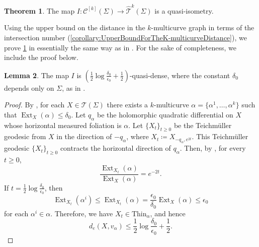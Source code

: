 \documentclass[a4paper,11pt]{amsart}
\numberwithin{equation}{section}
\theoremstyle{definition}
\newtheorem{theorem}{Theorem}[section]
\newtheorem{lemma}[theorem]{Lemma}
\newcommand{\Teich}{\mathcal{T}}
\newcommand{\elTeich}{\hat{\mathcal{T}}}
\DeclareMathOperator{\Ext}{Ext}
\newcommand{\Thin}{\mathrm{Thin}}
\newcommand{\multicurve}[1]{\mathcal{C}^{[#1]}}
\begin{document}
\begin{theorem}\label{theorem:K-ElectricTeichmullerSpaceAndK-multicurveGraphAreQI}
    The map $I \colon \multicurve{k}(\Sigma) \to \elTeich^k(\Sigma)$ is a   quasi-isometry.
\end{theorem}

Using the upper bound on the distance in the $k$-multicurve graph in terms of the intersection number (\cref{corollary:UpperBoundForTheK-multicurveDistance}), we prove \cref{theorem:K-ElectricTeichmullerSpaceAndK-multicurveGraphAreQI} in essentially the same way as in \cite{masur1999complex}.
For the sake of completeness, we include the proof below.

\begin{lemma}\label{lemma:QuasiDensityOfI}
    The map $I$ is $(\frac12 \log \frac{\delta_0}{\epsilon_0} + \frac12)$-quasi-dense, where the constant $\delta_0$ depends only on $\Sigma$, as in .
\end{lemma}

\begin{proof}
    By , for each $X \in \Teich(\Sigma)$ there exists a $k$-multicurve $\alpha = \{\alpha^1,\ldots,\alpha^k\}$ such that $\Ext_X(\alpha) \le \delta_0$.
    Let $q_\alpha$ be the holomorphic quadratic differential on $X$ whose horizontal measured foliation is $\alpha$.
    Let $\{X_t\}_{t \ge 0}$ be the Teichmüller geodesic from $X$ in the direction of $-q_\alpha$, where $X_t \coloneqq X_{-q_\alpha,e^{2t}}$.
    This Teichmüller geodesic $\{X_t\}_{t \ge 0}$ contracts the horizontal direction of $q_\alpha$.
    Then, by , for every $t \ge 0$,
    \begin{equation*}
        \frac{\Ext_{X_t}(\alpha)}{\Ext_X(\alpha)} = e^{-2t}.
    \end{equation*}
    If $t = \tfrac12 \log \tfrac{\delta_0}{\epsilon_0}$, then
    \begin{equation*}
        \Ext_{X_t}(\alpha^i) \leq \Ext_{X_t}(\alpha) = \frac{\epsilon_0}{\delta_0}\Ext_X(\alpha) \leq \epsilon_0
    \end{equation*}
    for each $\alpha^i \in \alpha$.
    Therefore, we have $X_t \in \Thin_\alpha$, and hence
    \begin{equation*}
        d_e(X, v_\alpha)
        \leq \frac12 \log \frac{\delta_0}{\epsilon_0} + \frac12.
    \end{equation*}
\end{proof}
\end{document}
